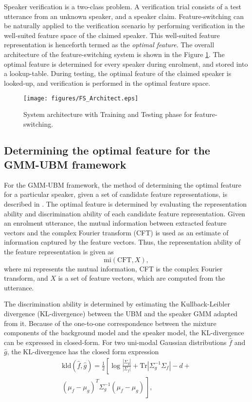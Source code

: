 \documentclass{article}
\begin{document}
Speaker verification is a two-class problem. A verification trial consists of a
test utterance from an unknown speaker, and a speaker claim. Feature-switching
can be naturally applied to the verification scenario by performing
verification in the well-suited feature space of the claimed speaker. This
well-suited feature representation is henceforth termed as the \emph{optimal
feature}. The overall architecture of the feature-switching system is shown in the
Figure \ref{fig:systemArch}. The optimal feature is determined for every speaker
during enrolment, and stored into a lookup-table. During testing, the optimal
feature of the claimed speaker is looked-up, and verification is performed in
the optimal feature space.

\begin{figure}[th]
\centering
\texttt{[image: figures/FS\_Architect.eps]}
\caption{System architecture with Training and Testing phase for feature-switching.}
\label{fig:systemArch}
\end{figure}



\subsection{Determining the optimal feature for the GMM-UBM framework}
\label{subsec:ubm_optFeat}

For the GMM-UBM framework, the method of determining the optimal feature for a
particular speaker, given a set of candidate feature representations, is
described in \cite{padmanInterspeech2010}. The optimal feature is determined by
evaluating the representation ability and discrimination ability
of each candidate feature representation. Given an enrolment utterance, the mutual information between extracted feature vectors and the complex Fourier transform (CFT) is used as an estimate of information captured by the feature vectors. Thus, the
representation ability of the feature representation is given as 
\begin{equation}
\textrm{mi}(\textrm{CFT},X),
\end{equation}
where $\textrm{mi}$ represents the mutual information, CFT is the complex
Fourier transform, and $X$ is a set of feature vectors, which are computed from
the utterance.


The discrimination ability is determined by estimating the Kullback-Leibler divergence (KL-divergence) between the UBM and the speaker GMM adapted from it. Because of the one-to-one
correspondence between the mixture components of the background model and the speaker model, the KL-divergence can be expressed in closed-form. For two uni-modal Gaussian distributions $\hat{f}$ and $\hat{g}$, the KL-divergence has the closed form expression
\begin{equation}
\begin{split}
\textrm{kld}(\hat{f},\hat{g}) = \frac{1}{2}\left[ \log \frac{|\Sigma_g|}{|\Sigma_f|} +
	\textrm{Tr}|\Sigma^{-1}_g\Sigma_f| - d + \right. \\ 
\left. (\mu_f-\mu_g)^T\Sigma_g^{-1}(\mu_f-\mu_g) \frac{}{} \right], 
\end{split}
\label{eq:kldGaussians}
\end{equation}
\end{document}

